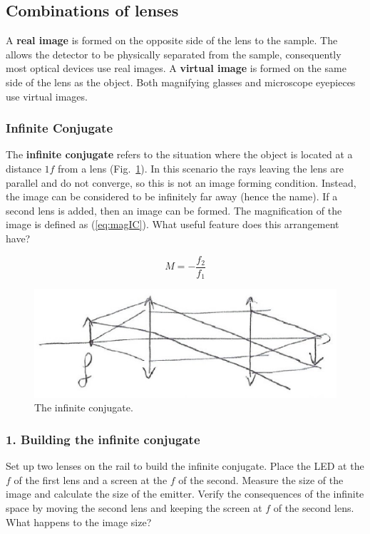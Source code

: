 \documentclass[a4paper]{report}
\begin{document}
\subsection{Combinations of lenses}
A \textbf{real image} is formed on the opposite side of the lens to
the sample. The allows the detector to be physically separated from
the sample, consequently most optical devices use real images. A
\textbf{virtual image} is formed on the same side of the lens as the
object. Both magnifying glasses and microscope eyepieces use virtual
images. 

\subsubsection{Infinite Conjugate}
The \textbf{infinite conjugate} refers to the situation where the
object is located at a distance $1f$ from a lens
(Fig.~\ref{infiniteConjugate}). In this scenario the rays leaving the
lens are parallel and do not converge, so this is not an image forming
condition. Instead, the image can be considered to be infinitely far
away (hence the name). If a second lens is added, then an image can
be formed. The magnification of the image is defined as
(\ref{eq:magIC}). What useful feature does this arrangement have? 

\begin{equation}
M=-\frac{f_2}{f_1}
\label{eq:magIC}
\end{equation}

\begin{figure}[h]
\center
\includegraphics[width=4.5in]{infiniteConjugate.eps}
\caption{The infinite conjugate.}
\label{infiniteConjugate}
\end{figure}
\subsubsection{1. Building the infinite conjugate}
Set up two lenses on the rail to build the infinite conjugate. Place
the LED at the $f$ of the first lens and a screen at the $f$ of the
second. Measure the size of the image and calculate the size of the
emitter. Verify the consequences of the infinite space by moving the
second lens and keeping the screen at $f$ of the second lens. What
happens to the image size?
\end{document}
